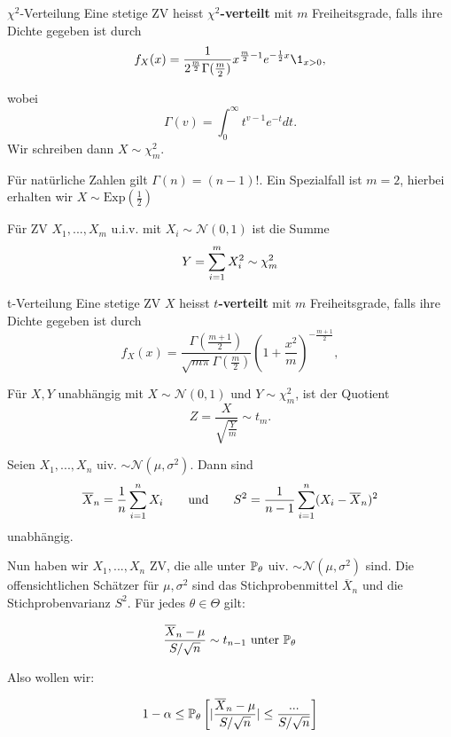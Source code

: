 
\begin{mainbox}{{$\chi^2$-Verteilung}}
Eine stetige ZV heisst \textbf{$\chi^2$-verteilt} mit $m$ Freiheitsgrade, falls ihre Dichte gegeben ist durch
$$f_X(x) = \frac{1}{2^{\frac{m}{2}} \Gamma (\frac{m}{2})} x^{\frac{m}{2}-1} e^{-\frac{1}{2}x} \1_{x > 0},$$
\end{mainbox}
wobei 
$$\Gamma(v) = \int_0^\infty t^{v-1} e^{-t} dt.$$
Wir schreiben dann $X \sim \chi^2_m$.

Für natürliche Zahlen gilt $\Gamma(n) = (n-1)!$. Ein Spezialfall ist $m = 2$, hierbei erhalten wir $X \sim \text{Exp}(\frac{1}{2})$ \medskip

\begin{subbox}{} Für ZV $X_1, ..., X_m$ u.i.v. mit $X_i \sim \mathcal{N}(0,1)$ ist die Summe 
$$Y = \sum\limits_{i=1}^m X_i^2 \sim \chi_m^2$$
\end{subbox}
\begin{mainbox}{t-Verteilung}
Eine stetige ZV $X$ heisst \textbf{$t$-verteilt} mit $m$ Freiheitsgrade, falls ihre Dichte gegeben ist durch 
$$f_X(x) = \frac{\Gamma (\frac{m+1}{2})}{\sqrt{m \pi} \Gamma (\frac{m}{2})} \left( 1 + \frac{x^2}{m} \right)^{-\frac{m+1}{2}},$$
\end{mainbox}
\begin{subbox}{} Für $X, Y$ unabhängig mit $X \sim \mathcal{N}(0,1)$ und $Y \sim \chi^2_m$, ist der Quotient
$$Z = \frac{X}{\sqrt{\frac{Y}{m}}} \sim t_m.$$\end{subbox}



\begin{subbox}{} Seien $X_1,...,X_n$ uiv. $\sim \mathcal{N}(\mu, \sigma^2)$. Dann sind
$$\overline{X}_n = \frac{1}{n} \sum\limits_{i=1}^n X_i \qquad \text{und} \qquad S^2 = \frac{1}{n-1} \sum\limits_{i = 1}^n (X_i - \overline{X}_n)^2$$
unabhängig. \end{subbox}

Nun haben wir $X_1,...,X_n$ ZV, die alle unter $\mathbb{P}_\theta$ uiv. $\sim \mathcal{N}(\mu, \sigma^2)$ sind. Die offensichtlichen Schätzer für $\mu, \sigma^2$ sind das Stichprobenmittel $\overline{X}_n$ und die Stichprobenvarianz $S^2$. Für jedes $\theta \in \Theta$ gilt:

$$\frac{\overline{X}_n - \mu}{S / \sqrt{n}} \sim t_{n-1} \text{ unter } \mathbb{P}_\theta$$

Also wollen wir:

$$1- \alpha \leq \mathbb{P}_\theta \left[ | \frac{\overline{X}_n - \mu}{S / \sqrt{n}} | \leq \frac{...}{ S / \sqrt{n}} \right]$$

